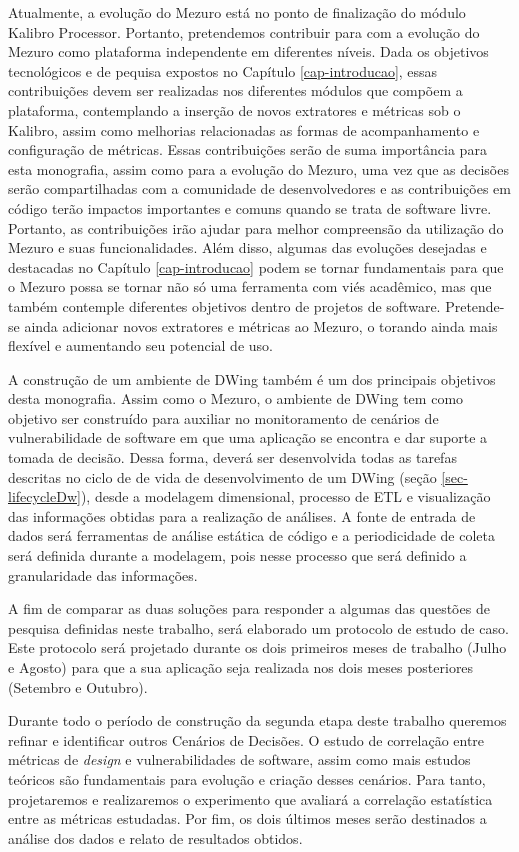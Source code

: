 %

Atualmente, a evolução do Mezuro está no ponto de finalização do módulo Kalibro Processor. Portanto, pretendemos contribuir para com a evolução do Mezuro como plataforma independente em diferentes níveis. Dada os objetivos tecnológicos e de pequisa expostos no Capítulo \ref{cap-introducao}, essas contribuições devem ser realizadas nos diferentes módulos que compõem a plataforma, contemplando a inserção de novos extratores e métricas sob o Kalibro, assim como melhorias relacionadas as formas de acompanhamento e configuração de métricas. Essas contribuições serão de suma importância para esta monografia, assim como para a evolução do Mezuro, uma vez que as decisões serão compartilhadas com a comunidade de desenvolvedores e as contribuições em código terão impactos importantes e comuns quando se trata de software livre. Portanto, as contribuições irão ajudar para melhor compreensão da utilização do Mezuro e suas funcionalidades. Além disso, algumas das evoluções desejadas e destacadas no Capítulo \ref{cap-introducao} podem se tornar fundamentais para que o Mezuro possa se tornar não só uma ferramenta com viés acadêmico, mas que também contemple diferentes objetivos dentro de projetos de software. Pretende-se ainda adicionar novos extratores e métricas ao Mezuro, o torando ainda mais flexível e aumentando seu potencial de uso.

%

A construção de um ambiente de DWing também é um dos principais objetivos desta monografia. Assim como o Mezuro, o ambiente de DWing tem como objetivo ser construído para auxiliar no monitoramento de cenários de vulnerabilidade de software em que uma aplicação se encontra e dar suporte a tomada de decisão. Dessa forma, deverá ser desenvolvida todas as tarefas descritas no ciclo de de vida de desenvolvimento de um DWing (seção \ref{sec-lifecycleDw}), desde a modelagem dimensional, processo de ETL e visualização das informações obtidas para a realização de análises. A fonte de entrada de dados será ferramentas de análise estática de código e a periodicidade de coleta será definida durante a modelagem, pois nesse processo que será definido a granularidade das informações.

%

A fim de comparar as duas soluções para responder a algumas das questões de pesquisa definidas neste trabalho, será elaborado um protocolo de estudo de caso. Este protocolo será projetado durante os dois primeiros meses de trabalho (Julho e Agosto) para que a sua aplicação seja realizada nos dois meses posteriores (Setembro e Outubro).

%

Durante todo o período de construção da segunda etapa deste trabalho queremos refinar e identificar outros Cenários de Decisões. O estudo de correlação entre métricas de \emph{design} e vulnerabilidades de software, assim como mais estudos teóricos são fundamentais para evolução e criação desses cenários. Para tanto, projetaremos e realizaremos o experimento que avaliará a correlação estatística entre as métricas estudadas. Por fim, os dois últimos meses serão destinados a análise dos dados e relato de resultados obtidos. 

